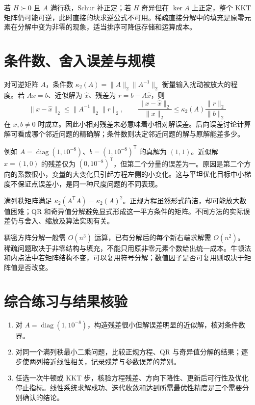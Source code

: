 \documentclass[UTF8,12pt,a4paper,fontset=fandol]{ctexbook}
\begin{document}
若 $H\succ0$ 且 $A$ 满行秩，Schur 补正定；若 $H$ 奇异但在 $\ker A$ 上正定，整个 KKT 矩阵仍可能可逆，此时直接的块求逆公式不可用。稀疏直接分解中的填充是原零元素在分解中变为非零的现象，适当排序可降低存储和运算成本。

\section{条件数、舍入误差与规模}

对可逆矩阵 $A$，条件数 $\kappa_2(A)=\|A\|_2\|A^{-1}\|_2$ 衡量输入扰动被放大的程度。若 $Ax=b$、近似解为 $\widehat x$、残差为 $r=b-A\widehat x$，则
\[
 \|x-\widehat x\|_2\leq\|A^{-1}\|_2\|r\|_2,
 \qquad
 \frac{\|x-\widehat x\|_2}{\|x\|_2}
 \leq\kappa_2(A)\frac{\|r\|_2}{\|b\|_2}
\]
在 $x,b\ne0$ 时成立。因此小相对残差未必意味着小相对解误差。后向误差讨论计算解可看成哪个邻近问题的精确解；条件数则决定邻近问题的解与原解能差多少。

例如 $A=\operatorname{diag}(1,10^{-8})$、$b=(1,10^{-8})^{\mathsf T}$ 的真解为 $(1,1)$。近似解 $\widehat x=(1,0)$ 的残差仅为 $(0,10^{-8})^{\mathsf T}$，但第二个分量的误差为一。原因是第二个方向的系数很小，变量的大变化只引起方程左侧的小变化。这与平坦优化目标中小梯度不保证点误差小，是同一种尺度问题的不同表现。

满列秩矩阵满足 $\kappa_2(A^{\mathsf T}A)=\kappa_2(A)^2$。正规方程虽然形式简洁，却可能放大数值困难；QR 和奇异值分解避免显式形成这一平方条件的矩阵。不同方法的实际误差仍与舍入、缩放及算法实现有关。

稠密方阵分解一般需 $O(n^3)$ 运算，已有分解后的每个新右端求解需 $O(n^2)$。稀疏问题取决于非零结构与填充，不能只用原非零元素个数给出统一成本。牛顿法和内点法中若矩阵结构不变，可以复用符号分解；数值因子是否可复用则取决于矩阵值是否改变。

\section{综合练习与结果核验}
\begin{enumerate}
 \item 对 $A=\operatorname{diag}(1,10^{-8})$，构造残差很小但解误差明显的近似解，核对条件数界。
 \item 对同一个满列秩最小二乘问题，比较正规方程、QR 与奇异值分解的结果；逐步使两列接近线性相关，记录残差与参数误差的差别。
 \item 任选一次牛顿或 KKT 步，核验方程残差、方向下降性、更新后可行性及优化停止指标。线性系统求解成功、迭代收敛和达到所需最优性精度是三个需要分别确认的结论。
\end{enumerate}
\end{document}
